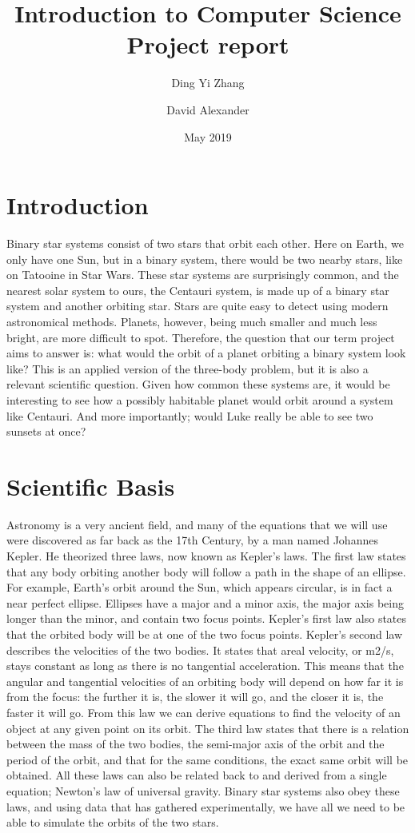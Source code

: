\documentclass[12pt]{article}
\title{Introduction to Computer Science\\ Project report}
\author{Ding Yi Zhang
\and David Alexander}
\date{May 2019}
\begin{document}
\maketitle


\section{Introduction}
Binary star systems consist of two stars that orbit each other. Here on Earth, we only have one Sun, but in a binary system, there would be two nearby stars, like on Tatooine in Star Wars. These star systems are surprisingly common, and the nearest solar system to ours, the Centauri system, is made up of a binary star system and another orbiting star. Stars are quite easy to detect using modern astronomical methods. Planets, however, being much smaller and much less bright, are more difficult to spot. Therefore, the question that our term project aims to answer is: what would the orbit of a planet orbiting a binary system look like? This is an applied version of the three-body problem, but it is also a relevant scientific question. Given how common these systems are, it would be interesting to see how a possibly habitable planet would orbit around a system like Centauri. And more importantly; would Luke really be able to see two sunsets at once?

\section{Scientific Basis}
Astronomy is a very ancient field, and many of the equations that we will use were discovered as far back as the 17th Century, by a man named Johannes Kepler. He theorized three laws, now known as Kepler’s laws. The first law states that any body orbiting another body will follow a path in the shape of an ellipse. For example, Earth’s orbit around the Sun, which appears circular, is in fact a near perfect ellipse. Ellipses have a major and a minor axis, the major axis being longer than the minor, and contain two focus points. Kepler’s first law also states that the orbited body will be at one of the two focus points. Kepler’s second law describes the velocities of the two bodies. It states that areal velocity, or m2/s, stays constant as long as there is no tangential acceleration. This means that the angular and tangential velocities of an orbiting body will depend on how far it is from the focus: the further it is, the slower it will go, and the closer it is, the faster it will go. From this law we can derive equations to find the velocity of an object at any given point on its orbit. The third law states that there is a relation between the mass of the two bodies, the semi-major axis of the orbit and the period of the orbit, and that for the same conditions, the exact same orbit will be obtained. All these laws can also be related back to and derived from a single equation; Newton’s law of universal gravity.  Binary star systems also obey these laws, and using data that has gathered experimentally, we have all we need to be able to simulate the orbits of the two stars.
\end{document}
